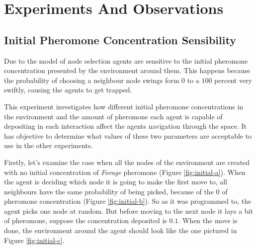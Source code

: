 \chapter{Experiments And Observations}
\label{ch:experiments-and-observations}

\section{Initial Pheromone Concentration Sensibility}

Due to the model of node selection agents are sensitive to the initial pheromone concentration presented by the environment around them. This happens because the probability of choosing a neighbour node swings form $0$ to a $100$ percent very swiftly, causing the agents to get trapped.

This experiment investigates how different initial pheromone concentrations in the environment and the amount of pheromone each agent is capable of depositing in each interaction affect the agents navigation through the space. It has objective to determine what values of these two parameters are acceptable to use in the other experiments.

Firstly, let's examine the case when all the nodes of the environment are created with no initial concentration of \emph{Forage} pheromone (Figure \ref{fig:initial-a}). When the agent is deciding which node it is going to make the first move to, all neighbours have the same probability of being picked, because of the $0$ of pheromone concentration (Figure \ref{fig:initial-b}). So as it was programmed to, the agent picks one node at random. But before moving to the next node it lays a bit of pheromone, suppose the concentration deposited is $0.1$. When the move is done, the environment around the agent should look like the one pictured in Figure \ref{fig:initial-c}.


